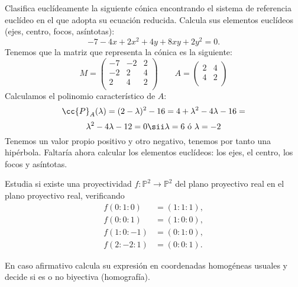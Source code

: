 \documentclass[12pt]{article}
\begin{document}
        \begin{ejercicio}[3 puntos] Clasifica euclídeamente la siguiente cónica encontrando el sistema de referencia euclídeo en el que adopta su ecuación reducida. Calcula sus elementos euclídeos (ejes, centro, focos, asíntotas):
        \[
        -7 - 4x + 2x^2 + 4y + 8xy + 2y^2 = 0.
        \]
        Tenemos que la matriz que representa la cónica es la siguiente:
        $$M = \begin{pmatrix}
                    -7 & -2 & 2\\
                    -2 & 2 & 4\\
                    2 & 4 & 2\\
            \end{pmatrix}
            \qquad
        A = \begin{pmatrix}
            2 & 4 \\
            4 & 2 \\
        \end{pmatrix} $$
        Calculamos el polinomio característico de $A$:
        $$\cc{P}_A(\lambda) = (2-\lambda)^2 - 16 = 4 + \lambda^2 -4\lambda - 16 =$$ 
        $$\lambda^2 - 4\lambda - 12 = 0 \sii \lambda = 6 \mbox{ ó } \lambda = -2$$
        Tenemos un valor propio positivo y otro negativo, tenemos por tanto una hipérbola. Faltaría ahora calcular los elementos euclídeos: los ejes, el centro, los focos y asíntotas.
        \end{ejercicio}
        
        \begin{ejercicio}[2 puntos] Estudia si existe una proyectividad \( f : \mathbb{P}^2 \to \mathbb{P}^2 \) del plano proyectivo real en el plano proyectivo real, verificando
        \begin{align*}
            f(0 : 1 : 0) &= (1 : 1 : 1), \\
            f(0 : 0 : 1) &= (1 : 0 : 0), \\
            f(1 : 0 : -1) &= (0 : 1 : 0), \\
            f(2 : -2 : 1) &= (0 : 0 : 1).
        \end{align*}
        
        En caso afirmativo calcula su expresión en coordenadas homogéneas usuales y decide si es o no biyectiva (homografía).
        \end{ejercicio}
        
     
\end{document}
